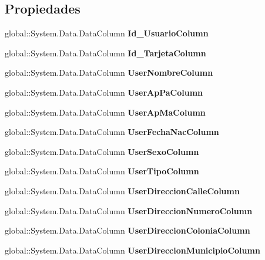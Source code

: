 \subsection*{Propiedades}
\begin{DoxyCompactItemize}
\item 
global\-::\-System.\-Data.\-Data\-Column {\bf Id\-\_\-\-Usuario\-Column}\hspace{0.3cm}{\ttfamily  [get]}
\item 
global\-::\-System.\-Data.\-Data\-Column {\bf Id\-\_\-\-Tarjeta\-Column}\hspace{0.3cm}{\ttfamily  [get]}
\item 
global\-::\-System.\-Data.\-Data\-Column {\bf User\-Nombre\-Column}\hspace{0.3cm}{\ttfamily  [get]}
\item 
global\-::\-System.\-Data.\-Data\-Column {\bf User\-Ap\-Pa\-Column}\hspace{0.3cm}{\ttfamily  [get]}
\item 
global\-::\-System.\-Data.\-Data\-Column {\bf User\-Ap\-Ma\-Column}\hspace{0.3cm}{\ttfamily  [get]}
\item 
global\-::\-System.\-Data.\-Data\-Column {\bf User\-Fecha\-Nac\-Column}\hspace{0.3cm}{\ttfamily  [get]}
\item 
global\-::\-System.\-Data.\-Data\-Column {\bf User\-Sexo\-Column}\hspace{0.3cm}{\ttfamily  [get]}
\item 
global\-::\-System.\-Data.\-Data\-Column {\bf User\-Tipo\-Column}\hspace{0.3cm}{\ttfamily  [get]}
\item 
global\-::\-System.\-Data.\-Data\-Column {\bf User\-Direccion\-Calle\-Column}\hspace{0.3cm}{\ttfamily  [get]}
\item 
global\-::\-System.\-Data.\-Data\-Column {\bf User\-Direccion\-Numero\-Column}\hspace{0.3cm}{\ttfamily  [get]}
\item 
global\-::\-System.\-Data.\-Data\-Column {\bf User\-Direccion\-Colonia\-Column}\hspace{0.3cm}{\ttfamily  [get]}
\item 
global\-::\-System.\-Data.\-Data\-Column {\bf User\-Direccion\-Municipio\-Column}\hspace{0.3cm}{\ttfamily  [get]}
\item 

\end{DoxyCompactItemize}
